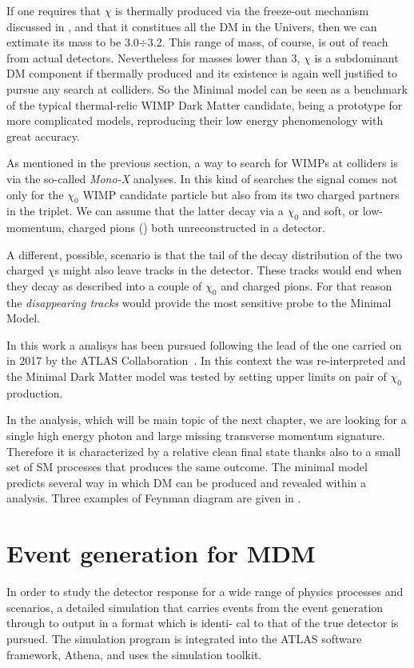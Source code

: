 If one requires that $\chi$ is thermally produced via the freeze-out mechanism discussed in \Sect{\ref{sec:wimp}}, and that it constitues all the DM in the Univers, then we can extimate its mass to be \SI{3.0}{}$\div$\SI{3.2}{\tev}. This range of mass, of course, is out of reach from actual detectors. Nevertheless for masses lower than \SI{3}{\tev}, $\chi$ is a subdominant DM component if thermally produced and its existence is again well justified to pursue any search at colliders. So the Minimal model can be seen as a benchmark of the typical thermal-relic WIMP Dark Matter candidate, being a prototype for more complicated models, reproducing their low energy phenomenology with great accuracy.

As mentioned in the previous section, a way to search for WIMPs at colliders is via the so-called \emph{Mono-X} analyses. In this kind of searches the signal comes not only for the $\chi_0$ WIMP candidate particle but also from its two charged partners in the triplet. We can assume that the latter decay via a $\chi_0$ and soft, or low-momentum, charged pions (\pipm) both unreconstructed in a detector. 

A different, possible, scenario is that the tail of the decay distribution of the two charged $\chi$s might also leave tracks in the detector. These tracks would end when they decay as described into a couple of $\chi_0$ and charged pions. For that reason the \emph{disappearing tracks} would provide the most sensitive probe to the Minimal Model.

In this work a \mph analisys has been pursued following the lead of the one carried on in 2017 by the ATLAS Collaboration~\cite{paperMP}. In this context the \mph was re-interpreted and the Minimal Dark Matter model was tested by setting upper limits on pair of $\chi_0$ production.

In the \mph analysis, which will be main topic of the next chapter, we are looking for a single high energy photon and large missing transverse momentum signature. Therefore it is characterized by a relative clean final state thanks also to a small set of SM processes that produces the same outcome. The minimal model predicts several way in which DM can be produced and revealed within a \mph analysis. Three examples of Feynman diagram are given in \Fig{\ref{fig:feynman}}.



\section{Event generation for MDM}
In order to study the detector response for a wide range of physics processes and scenarios, a detailed simulation  that carries events from the event generation through to output in a format which is identi- cal to that of the true detector is pursued. The simulation program is integrated into the ATLAS software framework, Athena, and uses the \geant \cite{geant4} simulation toolkit.

